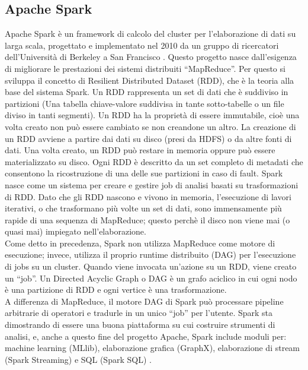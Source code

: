 \subsection{Apache Spark}
\label{sec:spark}
Apache Spark è un framework di calcolo del cluster per l'elaborazione di dati su larga scala, progettato e implementato nel 2010 da un gruppo di ricercatori dell’Università di Berkeley a San Francisco \cite{spark:hadoop}. Questo progetto nasce dall’esigenza di migliorare le prestazioni dei sistemi distribuiti “MapReduce”. Per questo si sviluppa il concetto di Resilient Distributed Dataset (RDD), che è la teoria alla base del sistema Spark. Un RDD rappresenta un set di dati che è suddiviso in partizioni (Una tabella chiave-valore suddivisa in tante sotto-tabelle o un file diviso in tanti segmenti). Un RDD ha la proprietà di essere immutabile, cioè una volta creato non può essere cambiato se non creandone un altro. La creazione di un RDD avviene a partire dai dati su disco (presi da HDFS) o da altre fonti di dati. Una volta creato, un RDD può restare in memoria oppure può essere materializzato su disco. Ogni RDD è descritto da un set completo di metadati che consentono la ricostruzione di una delle sue partizioni in caso di fault. Spark nasce come un sistema per creare e gestire job di analisi basati su trasformazioni di RDD. Dato che gli RDD nascono e vivono in memoria, l’esecuzione di lavori iterativi, o che trasformano più volte un set di dati, sono immensamente più rapide di una sequenza di MapReduce; questo perchè il disco non viene mai (o quasi mai) impiegato nell’elaborazione.
\\Come detto in precedenza, Spark non utilizza MapReduce come motore di esecuzione; invece, utilizza il proprio runtime distribuito (DAG) per l’esecuzione di jobs su un cluster. Quando viene invocata un’azione su un RDD, viene creato un “job”. Un Directed Acyclic Graph o DAG è un grafo aciclico in cui ogni nodo è una partizione di RDD e ogni vertice è una trasformazione. 
\\A differenza di MapReduce, il motore DAG di Spark può processare pipeline arbitrarie di operatori e tradurle in un unico “job” per l'utente. Spark sta dimostrando di essere una buona piattaforma su cui costruire strumenti di analisi, e, anche a questo fine del progetto Apache, Spark include moduli per: machine learning (MLlib), elaborazione grafica (GraphX), elaborazione di stream (Spark Streaming) e SQL (Spark SQL) \cite{spark:hadoop}.
